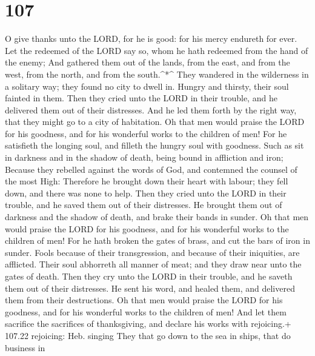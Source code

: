 \hypertarget{section-106}{%
\section{107}\label{section-106}}

 O give thanks unto the LORD, for he is good: for his mercy
endureth for ever.  Let the redeemed of the LORD say so,
whom he hath redeemed from the hand of the enemy;  And
gathered them out of the lands, from the east, and from the west, from
the north, and from the south.\^{}*\^{}  They wandered in
the wilderness in a solitary way; they found no city to dwell in.
 Hungry and thirsty, their soul fainted in them.
 Then they cried unto the LORD in their trouble, and he
delivered them out of their distresses.  And he led them
forth by the right way, that they might go to a city of habitation.
 Oh that men would praise the LORD for his goodness, and for
his wonderful works to the children of men!  For he
satisfieth the longing soul, and filleth the hungry soul with goodness.
 Such as sit in darkness and in the shadow of death, being
bound in affliction and iron;  Because they rebelled
against the words of God, and contemned the counsel of the most High:
 Therefore he brought down their heart with labour; they
fell down, and there was none to help.  Then they cried
unto the LORD in their trouble, and he saved them out of their
distresses.  He brought them out of darkness and the shadow
of death, and brake their bands in sunder.  Oh that men
would praise the LORD for his goodness, and for his wonderful works to
the children of men!  For he hath broken the gates of
brass, and cut the bars of iron in sunder.  Fools because
of their transgression, and because of their iniquities, are afflicted.
 Their soul abhorreth all manner of meat; and they draw
near unto the gates of death.  Then they cry unto the LORD
in their trouble, and he saveth them out of their distresses.
 He sent his word, and healed them, and delivered them from
their destructions.  Oh that men would praise the LORD for
his goodness, and for his wonderful works to the children of men!
 And let them sacrifice the sacrifices of thanksgiving, and
declare his works with rejoicing.+ 107.22 rejoicing: Heb. singing
 They that go down to the sea in ships, that do business in
